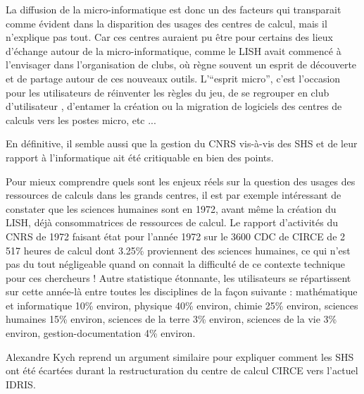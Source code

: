La diffusion de la micro-informatique est donc un des facteurs qui transparait comme évident dans la disparition des usages des centres de calcul, mais il n'explique pas tout. Car ces centres auraient pu être pour certains des lieux d'échange autour de la micro-informatique, comme le LISH avait commencé à l'envisager dans l'organisation de clubs, où règne souvent un esprit de découverte et de partage autour de ces nouveaux outils. L'\enquote{esprit micro}, c'est l'occasion pour les utilisateurs de réinventer les règles du jeu, de se regrouper en club d'utilisateur \autocite[57]{LISH1984}, d'entamer la création ou la migration de logiciels des centres de calculs vers les postes micro, etc ...

En définitive, il semble aussi que la gestion du CNRS vis-à-vis des SHS et de leur rapport à l'informatique ait été critiquable en bien des points.

Pour mieux comprendre quels sont les enjeux réels sur la question des usages des ressources de calculs dans les grands centres, il est par exemple intéressant de constater que les sciences humaines sont en 1972, avant même la création du LISH, déjà consommatrices de ressources de calcul. Le rapport d’activités du CNRS de 1972 faisant état pour l’année 1972 sur le 3600 CDC de CIRCE de 2 517 heures de calcul dont 3.25\% proviennent des sciences humaines, ce qui n’est pas du tout négligeable quand on connait la difficulté de ce contexte technique pour ces chercheurs ! Autre statistique étonnante, les utilisateurs se répartissent sur cette année-là entre toutes les disciplines  de la façon suivante : mathématique et informatique 10\% environ, physique 40\% environ, chimie 25\% environ, sciences humaines 15\% environ, sciences de la terre 3\% environ, sciences de la vie 3\% environ, gestion-documentation 4\% environ.

Alexandre Kych reprend un argument similaire pour expliquer comment les SHS ont été écartées durant la restructuration du centre de calcul CIRCE vers l'actuel IDRIS.

